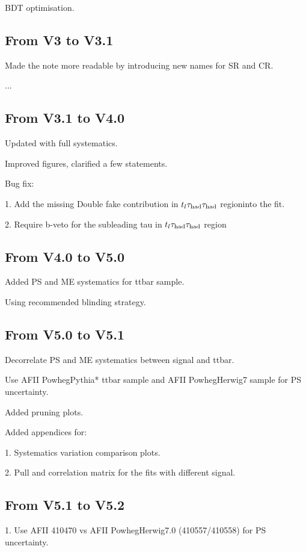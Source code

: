 BDT optimisation.

\subsection{From V3 to V3.1}

Made the note more readable by introducing new names for SR and CR.

...
\subsection{From V3.1 to V4.0}

Updated with full systematics.

Improved figures, clarified a few statements.

Bug fix:

1. Add the missing Double fake contribution in $t_l\tau_\text{had}\tau_\text{had}$ regioninto the fit.

2. Require b-veto for the subleading tau in $t_l\tau_\text{had}\tau_\text{had}$ region

\subsection{From V4.0 to V5.0}

Added PS and ME systematics for ttbar sample.

Using recommended blinding strategy.

\subsection{From V5.0 to V5.1}

Decorrelate PS and ME systematics between signal and ttbar.

Use AFII PowhegPythia* ttbar sample and AFII PowhegHerwig7 sample for PS uncertainty.

Added pruning plots.

Added appendices for:

1. Systematics variation comparison plots.

2. Pull and correlation matrix for the fits with different signal.

\subsection{From V5.1 to V5.2}

1. Use AFII 410470 vs AFII PowhegHerwig7.0 (410557/410558) for PS uncertainty.

